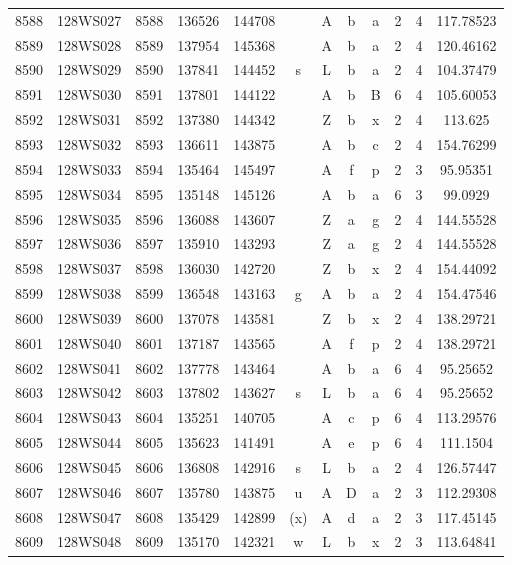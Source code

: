 \begin{tabular}{|*{12}{c|}}
8588 & 128WS027 & 8588 & 136526 & 144708 &  & A & b & a & 2 & 4 & 117.78523 \\ 
8589 & 128WS028 & 8589 & 137954 & 145368 &  & A & b & a & 2 & 4 & 120.46162 \\ 
8590 & 128WS029 & 8590 & 137841 & 144452 & s & L & b & a & 2 & 4 & 104.37479 \\ 
8591 & 128WS030 & 8591 & 137801 & 144122 &  & A & b & B & 6 & 4 & 105.60053 \\ 
8592 & 128WS031 & 8592 & 137380 & 144342 &  & Z & b & x & 2 & 4 & 113.625 \\ 
8593 & 128WS032 & 8593 & 136611 & 143875 &  & A & b & c & 2 & 4 & 154.76299 \\ 
8594 & 128WS033 & 8594 & 135464 & 145497 &  & A & f & p & 2 & 3 & 95.95351 \\ 
8595 & 128WS034 & 8595 & 135148 & 145126 &  & A & b & a & 6 & 3 & 99.0929 \\ 
8596 & 128WS035 & 8596 & 136088 & 143607 &  & Z & a & g & 2 & 4 & 144.55528 \\ 
8597 & 128WS036 & 8597 & 135910 & 143293 &  & Z & a & g & 2 & 4 & 144.55528 \\ 
8598 & 128WS037 & 8598 & 136030 & 142720 &  & Z & b & x & 2 & 4 & 154.44092 \\ 
8599 & 128WS038 & 8599 & 136548 & 143163 & g & A & b & a & 2 & 4 & 154.47546 \\ 
8600 & 128WS039 & 8600 & 137078 & 143581 &  & Z & b & x & 2 & 4 & 138.29721 \\ 
8601 & 128WS040 & 8601 & 137187 & 143565 &  & A & f & p & 2 & 4 & 138.29721 \\ 
8602 & 128WS041 & 8602 & 137778 & 143464 &  & A & b & a & 6 & 4 & 95.25652 \\ 
8603 & 128WS042 & 8603 & 137802 & 143627 & s & L & b & a & 6 & 4 & 95.25652 \\ 
8604 & 128WS043 & 8604 & 135251 & 140705 &  & A & c & p & 6 & 4 & 113.29576 \\ 
8605 & 128WS044 & 8605 & 135623 & 141491 &  & A & e & p & 6 & 4 & 111.1504 \\ 
8606 & 128WS045 & 8606 & 136808 & 142916 & s & L & b & a & 2 & 4 & 126.57447 \\ 
8607 & 128WS046 & 8607 & 135780 & 143875 & u & A & D & a & 2 & 3 & 112.29308 \\ 
8608 & 128WS047 & 8608 & 135429 & 142899 & (x) & A & d & a & 2 & 3 & 117.45145 \\ 
8609 & 128WS048 & 8609 & 135170 & 142321 & w & L & b & x & 2 & 3 & 113.64841 \\ 

\end{tabular}
